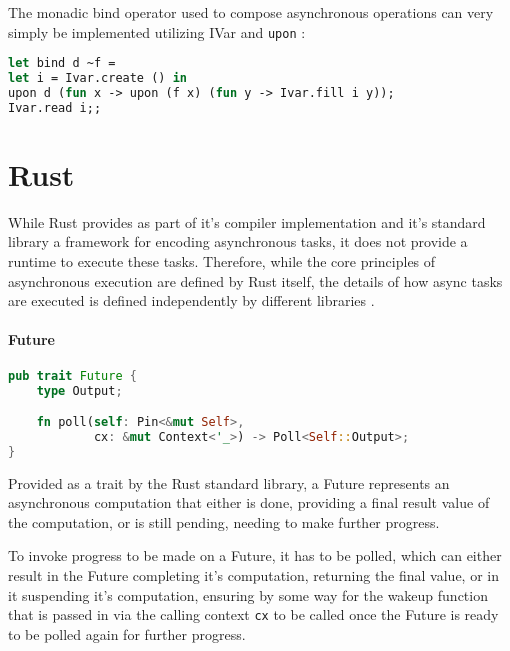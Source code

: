 \documentclass[a4paper,UKenglish,cleveref, autoref, thm-restate]{lipics-v2021}
\begin{document}
The monadic bind operator used to compose asynchronous operations can very simply be implemented utilizing IVar and \verb|upon| \cite{Concurre6:online}:

\begin{minipage}{\linewidth}
\begin{lstlisting}[language=Caml,caption={Implementation of bind},captionpos=t]
let bind d ~f =
let i = Ivar.create () in
upon d (fun x -> upon (f x) (fun y -> Ivar.fill i y));
Ivar.read i;;
\end{lstlisting}
\end{minipage}

\section{Rust}
\label{sec:rust}

While Rust provides as part of it's compiler implementation and it's standard library a framework for encoding asynchronous tasks, it does not provide a runtime to execute these tasks. Therefore, while the core principles of asynchronous execution are defined by Rust itself, the details of how async tasks are executed is defined independently by different libraries \cite{TheAsync92:online}.

\paragraph*{Future}

\begin{minipage}{\linewidth}
\begin{lstlisting}[language=Rust,caption={Definition of Future},captionpos=t]
pub trait Future {
    type Output;

    fn poll(self: Pin<&mut Self>,
            cx: &mut Context<'_>) -> Poll<Self::Output>;
}
\end{lstlisting}
\end{minipage}

Provided as a trait by the Rust standard library, a Future represents an asynchronous computation that either is done, providing a final result value of the computation, or is still pending, needing to make further progress.

To invoke progress to be made on a Future, it has to be polled, which can either result in the Future completing it's computation, returning the final value, or in it suspending it's computation, ensuring by some way for the wakeup function that is passed in via the calling context \verb|cx| to be called once the Future is ready to be polled again for further progress.
\end{document}
